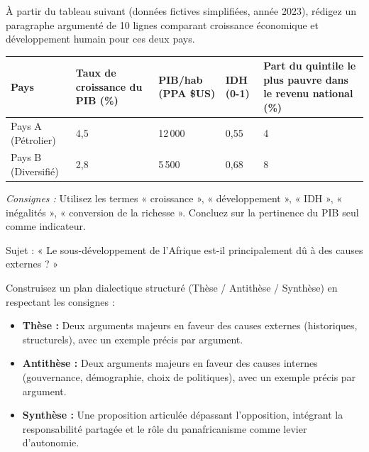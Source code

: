 \documentclass[11pt]{article}
\begin{document}
\begin{exercice}
À partir du tableau suivant (données fictives simplifiées, année 2023), rédigez un paragraphe argumenté de 10 lignes comparant croissance économique et développement humain pour ces deux pays.

\begin{center}
\begin{tabularx}{\linewidth}{|l|X|X|X|X|}\hline
Pays & Taux de croissance du PIB (\%) & PIB/hab (PPA \$US) & IDH (0-1) & Part du quintile le plus pauvre dans le revenu national (\%) \\ \hline
Pays A (Pétrolier) & 4,5 & 12\,000 & 0,55 & 4 \\
Pays B (Diversifié) & 2,8 & 5\,500 & 0,68 & 8 \\ \hline
\end{tabularx}
\end{center}

\textit{Consignes :} Utilisez les termes « croissance », « développement », « IDH », « inégalités », « conversion de la richesse ». Concluez sur la pertinence du PIB seul comme indicateur.
\end{exercice}

\begin{exercice}
Sujet : « Le sous-développement de l'Afrique est-il principalement dû à des causes externes ? »

Construisez un plan dialectique structuré (Thèse / Antithèse / Synthèse) en respectant les consignes :
\begin{itemize}
\item \textbf{Thèse :} Deux arguments majeurs en faveur des causes externes (historiques, structurels), avec un exemple précis par argument.
\item \textbf{Antithèse :} Deux arguments majeurs en faveur des causes internes (gouvernance, démographie, choix de politiques), avec un exemple précis par argument.
\item \textbf{Synthèse :} Une proposition articulée dépassant l'opposition, intégrant la responsabilité partagée et le rôle du panafricanisme comme levier d'autonomie.
\end{itemize}
\end{exercice}
\end{document}
